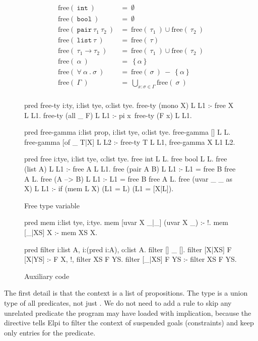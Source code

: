 \documentclass{these-ISSS}
\newenvironment{elpicode}
  {\VerbatimEnvironment\begin{elpibox}\begin{xelpicode}}{\end{xelpicode}
\end{elpibox}}
\begin{document}
\begin{figure}[p]
$$
\begin{array}{ll}
  \text{free}(\ \mathtt{int}\ ) &=\ \emptyset\\
  \text{free}(\ \mathtt{bool}\ ) &=\ \emptyset\\
  \text{free}(\ \mathtt{pair}\ \tau_1\ \tau_2\ ) &=\ \text{free}(\ \tau_1\ )\cup \text{free}(\ \tau_2\ ) \\
  \text{free}(\ \mathtt{list}\ \tau\ ) &=\ \text{free}(\ \tau ) \\
  \text{free}(\ \tau_1 \to \tau_2\ ) &=\ \text{free}(\ \tau_1\ )\cup \text{free}(\ \tau_2\ ) \\
  \text{free}(\ \alpha\ ) &=\ \left\{\alpha\right\}\\
  \text{free}(\ \forall\ \alpha\ .\ \sigma\ ) &=\ \text{free}(\ \sigma\ )\  -\  \left\{\alpha\right\}\\
  \text{free}(\ \Gamma\ ) &=\ \bigcup\limits_{x:\sigma \in \Gamma}\text{free}(\ \sigma\ )\\
\end{array}
$$
\begin{elpicode}
pred free-ty i:ty, i:list tye, o:list tye.
free-ty (mono X) L L1 :- free X L L1.
free-ty (all _ F) L L1 :- pi x\ free-ty (F x) L L1.

pred free-gamma i:list prop, i:list tye, o:list tye.
free-gamma [] L L.
free-gamma [of _ T|X] L L2 :- free-ty T L L1, free-gamma X L1 L2.

pred free i:tye, i:list tye, o:list tye.
free int L L.
free bool L L.
free (list A) L L1 :- free A L L1.
free (pair A B) L L1 :- L1 = {free B {free A L}}.
free (A --> B) L L1 :- L1 = {free B {free A L}}.
free (uvar _ _ as X) L L1 :- if (mem L X) (L1 = L) (L1 = [X|L]).
\end{elpicode}
\caption{Free type variable\label{img:free}}
\end{figure}
\begin{figure}[p]
\begin{elpicode}
pred mem i:list tye, i:tye.
mem [uvar X _|_] (uvar X _) :- !.
mem [_|XS] X :- mem XS X.
 
pred filter i:list A, i:(pred i:A), o:list A.
filter [] _ [].
filter [X|XS] F [X|YS] :- F X, !, filter XS F YS.
filter [_|XS] F YS :- filter XS F YS.
\end{elpicode}
\caption{Auxiliary code\label{img:aux}}
\end{figure}


The first detail is that the context is a list of propositions. The
 type is a union type of all predicates, not just .
We do not need to add a rule to skip any unrelated predicate
the program may have loaded with implication, because the  directive tells Elpi to filter the context of suspended goals
(constraints) and keep only entries for the  predicate.
\end{document}
